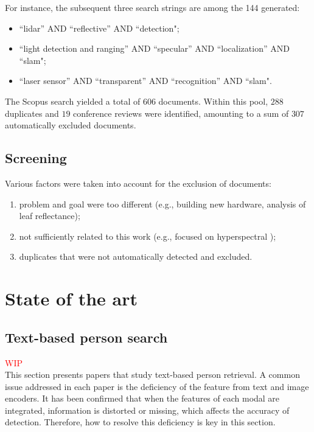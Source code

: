For instance, the subsequent three search strings are among the 144 generated:
\begin{itemize}
    \item ``lidar'' AND ``reflective'' AND ``detection";
    \item ``light detection and ranging'' AND ``specular'' AND ``localization'' AND ``slam";
    \item ``laser sensor'' AND ``transparent'' AND ``recognition'' AND ``slam".
\end{itemize}

The Scopus search yielded a total of $606$ documents. Within this pool, $288$ duplicates and $19$ conference reviews were identified, amounting to a sum of $307$ automatically excluded documents.

\subsection*{Screening}

Various factors were taken into account for the exclusion of documents:
\begin{enumerate}
    \item problem and goal were too different (e.g., building new hardware, analysis of leaf reflectance);
    \item not sufficiently related to this work (e.g., focused on hyperspectral );
    \item duplicates that were not automatically detected and excluded.
\end{enumerate}





\section{State of the art}
\subsection{Text-based person search}
\textcolor{red}{WIP}\\
This section presents papers that study text-based person retrieval. A common issue addressed in each paper is the deficiency of the feature from text and image encoders. It has been confirmed that when the features of each modal are integrated, information is distorted or missing, which affects the accuracy of detection. Therefore, how to resolve this deficiency is key in this section.

